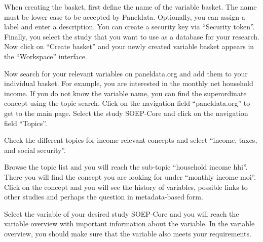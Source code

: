 \documentclass[letterpaper,10pt,openany,onesideH,english]{sphinxmanual}
\begin{document}
When creating the basket, first define the name of the variable basket. The name must be lower case to be accepted by Paneldata. Optionally, you can assign a label and enter a description. You can create a security key via “Security token”. Finally, you select the study that you want to use as a database for your research. Now click on “Create basket” and your newly created variable basket appears in the “Workspace” interface.

\begin{figure}[H]
\centering

\noindent{}
\end{figure}

Now search for your relevant variables on paneldata.org and add them to your individual basket. For example, you are interested in the monthly net household income. If you do not know the variable name, you can find the superordinate concept using the topic search. Click on the navigation field “paneldata.org” to get to the main page. Select the study SOEP-Core and click on the navigation field “Topics”.

\begin{figure}[H]
\centering

\noindent{}
\end{figure}

Check the different topics for income-relevant concepts and select “income, taxes, and social security”.

\begin{figure}[H]
\centering

\noindent{}
\end{figure}

Browse the topic list and you will reach the sub-topic “household income hhi”. There you will find the concept you are looking for under “monthly income moi”. Click on the concept and you will see the history of variables, possible links to other studies and perhaps the question in metadata-based form.

\begin{figure}[H]
\centering

\noindent{}
\end{figure}

Select the variable of your desired study SOEP-Core and you will reach the variable overview with important information about the variable. In the variable overview, you should make sure that the variable also meets your requirements.
\end{document}
